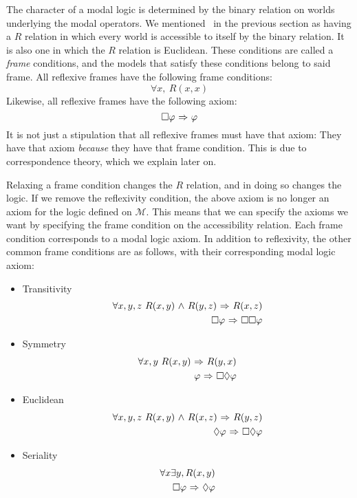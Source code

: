 The character of a modal logic is determined by the binary relation on worlds underlying the modal operators. We mentioned \SFive\ in the previous section as having a $R$ relation in which every world is accessible to itself by the binary relation. It is also one in which the $R$ relation is Euclidean. These conditions are called a \emph{frame} conditions, and the models that satisfy these conditions belong to said frame. All reflexive frames have the following frame conditions:
\begin{equation}
\forall x,\ R(x,x)
\end{equation}
Likewise, all reflexive frames have the following axiom:
\begin{equation}
	\Box \varphi {\ \Rightarrow \ } \varphi
\end{equation}
It is not just a stipulation that all reflexive frames must have that axiom: They have that axiom \emph{because} they have that frame condition. This is due to correspondence theory, which we explain later on.

Relaxing a frame condition changes the $R$ relation, and in doing so changes the logic. If we remove the reflexivity condition, the above axiom is no longer an axiom for the logic defined on $\mathcal{M}$. This means that we can specify the axioms we want by specifying the frame condition on the accessibility relation. Each frame condition corresponds to a modal logic axiom. In addition to reflexivity, the other common frame conditions are as follows, with their corresponding modal logic axiom:
\begin{itemize}
	\item Transitivity
	\begin{eqnarray}
	\forall x,y,z\ R(x,y) {\ \wedge \ } R(y,z) {\ \Rightarrow \ } R(x,z)\\
	\Box \varphi {\ \Rightarrow \ } \Box \Box \varphi
	\end{eqnarray}
	\item Symmetry
	\begin{eqnarray}
	\forall x,y\ R(x,y) {\ \Rightarrow \ } R(y,x)\\
	\varphi {\ \Rightarrow \ } \Box \Diamond \varphi
	\end{eqnarray}
	\item Euclidean
	\begin{eqnarray}
	\forall x,y,z\ R(x,y) {\ \wedge \ } R(x,z) {\ \Rightarrow \ } R(y,z)\\
	\Diamond \varphi {\ \Rightarrow \ } \Box \Diamond \varphi
	\end{eqnarray}
	\item Seriality
	\begin{eqnarray}
	\forall x \exists y, R(x,y) \\
	\Box \varphi {\ \Rightarrow \ } \Diamond \varphi
	\end{eqnarray}
\end{itemize}

